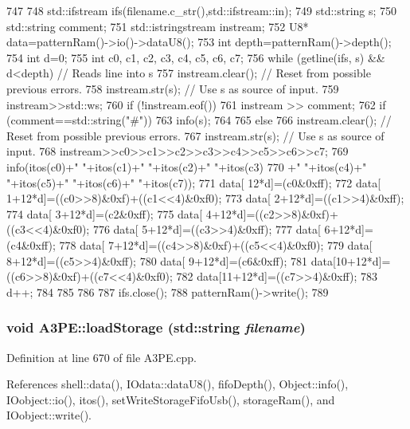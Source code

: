 \begin{DoxyCode}
747                                         {
748   std::ifstream ifs(filename.c_str(),std::ifstream::in);
749   std::string s;
750   std::string comment;
751   std::istringstream instream;
752   U8* data=patternRam()->io()->dataU8();
753   int depth=patternRam()->depth();
754   int d=0;
755   int c0, c1, c2, c3, c4, c5, c6, c7;
756   while (getline(ifs, s) && d<depth) { // Reads line into s
757       instream.clear();     // Reset from possible previous errors.
758       instream.str(s);      // Use s as source of input.
759       instream>>std::ws;
760       if (!instream.eof()) {
761         instream >> comment;
762         if (comment==std::string("#")) {
763           info(s);
764         }
765         else {
766           instream.clear();     // Reset from possible previous errors.
767           instream.str(s);      // Use s as source of input.
768           instream>>c0>>c1>>c2>>c3>>c4>>c5>>c6>>c7;
769           info(itos(c0)+" "+itos(c1)+" "+itos(c2)+" "+itos(c3)
770               +" "+itos(c4)+" "+itos(c5)+" "+itos(c6)+" "+itos(c7));
771           data[   12*d]=(c0&0xff);
772           data[ 1+12*d]=((c0>>8)&0xf)+((c1<<4)&0xf0);
773           data[ 2+12*d]=((c1>>4)&0xff);
774           data[ 3+12*d]=(c2&0xff);
775           data[ 4+12*d]=((c2>>8)&0xf)+((c3<<4)&0xf0);
776           data[ 5+12*d]=((c3>>4)&0xff);
777           data[ 6+12*d]=(c4&0xff);
778           data[ 7+12*d]=((c4>>8)&0xf)+((c5<<4)&0xf0);
779           data[ 8+12*d]=((c5>>4)&0xff);
780           data[ 9+12*d]=(c6&0xff);
781           data[10+12*d]=((c6>>8)&0xf)+((c7<<4)&0xf0);
782           data[11+12*d]=((c7>>4)&0xff);
783           d++;
784         }
785       }
786   }
787   ifs.close();
788   patternRam()->write();
789 }
\end{DoxyCode}
\hypertarget{classA3PE_a8bd4a7a5dd8219f93386756c24a0f0b5}{
\subsubsection[{loadStorage}]{\setlength{\rightskip}{0pt plus 5cm}void A3PE::loadStorage (std::string {\em filename})}}
\label{classA3PE_a8bd4a7a5dd8219f93386756c24a0f0b5}


Definition at line 670 of file A3PE.cpp.

References shell::data(), IOdata::dataU8(), fifoDepth(), Object::info(), IOobject::io(), itos(), setWriteStorageFifoUsb(), storageRam(), and IOobject::write().

